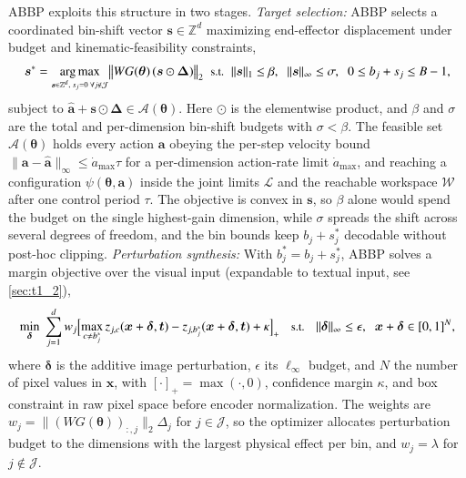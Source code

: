\documentclass[11pt,letterpaper]{article}
\begin{document}
ABBP exploits this structure in two stages.
 \emph{Target selection:} ABBP selects a coordinated bin-shift vector $\bm{s}\in\mathbb{Z}^{d}$ maximizing end-effector displacement under budget and kinematic-feasibility constraints,
\vspace{-1.5ex}\begin{equation}
  \small
\bm{s}^{*}=\argmax_{\substack{\bm{s}\in\mathbb{Z}^{d},\; s_j=0\;\forall j\notin\mathcal{J}}}
\bigl\|W G(\bm{\theta})\,(\bm{s}\odot\bm{\Delta})\bigr\|_{2}
\;\;\text{s.t.}\;\;
\|\bm{s}\|_{1}\le\beta,\;\;
\|\bm{s}\|_{\infty}\le\sigma,\;\;
0\le b_j+s_j\le B-1,
\label{eq:abbp-shift}
\vspace{-1.5ex}\end{equation}
subject to $\hat{\bm{a}}+\bm{s}\odot\bm{\Delta}\in\mathcal{A}(\bm{\theta})$. Here $\odot$ is the
elementwise product, and $\beta$ and $\sigma$ are the total and per-dimension bin-shift budgets with
$\sigma<\beta$. The feasible set $\mathcal{A}(\bm{\theta})$ holds every action $\bm{a}$ obeying the
per-step velocity bound $\|\bm{a}-\hat{\bm{a}}\|_{\infty}\le\dot a_{\max}\tau$ for a per-dimension
action-rate limit $\dot a_{\max}$, and reaching a configuration $\psi(\bm{\theta},\bm{a})$ inside the
joint limits $\mathcal{L}$ and the reachable workspace $\mathcal{W}$ after one control period $\tau$.
The objective is convex in $\bm{s}$, so $\beta$ alone would spend the budget on the single
highest-gain dimension, while $\sigma$ spreads the shift across several degrees of freedom, and the
bin bounds keep $b_j+s_j^{*}$ decodable without post-hoc clipping.
 \emph{Perturbation synthesis:} With $b_j^{*}=b_j+s_j^{*}$, ABBP solves a margin objective over the visual input (expandable to textual input, see \autoref{sec:t1_2}),
\vspace{-3ex}\begin{equation}
  \small
\min_{\bm{\delta}}\;\sum_{j=1}^{d} w_j
\Bigl[\max_{c\neq b_j^{*}} z_{j,c}(\bm{x}+\bm{\delta},\bm{t})-z_{j,b_j^{*}}(\bm{x}+\bm{\delta},\bm{t})+\kappa\Bigr]_{+}
\quad\text{s.t.}\quad
\|\bm{\delta}\|_{\infty}\le\epsilon,\;\;\bm{x}+\bm{\delta}\in[0,1]^{N},
\label{eq:abbp-obj}
\vspace{-1.5ex}\end{equation}
where $\bm{\delta}$ is the additive image perturbation, $\epsilon$ its $\ell_{\infty}$ budget, and $N$ the number of pixel values in $\bm{x}$, with $[\cdot]_{+}=\max(\cdot,0)$, confidence margin $\kappa$, and box constraint in raw pixel space before encoder normalization. The weights are $w_j=\|(WG(\bm{\theta}))_{:,j}\|_{2}\Delta_j$ for $j\in\mathcal{J}$, so the optimizer allocates perturbation budget to the dimensions with the largest physical effect per bin, and $w_j=\lambda$ for $j\notin\mathcal{J}$. 
\end{document}
